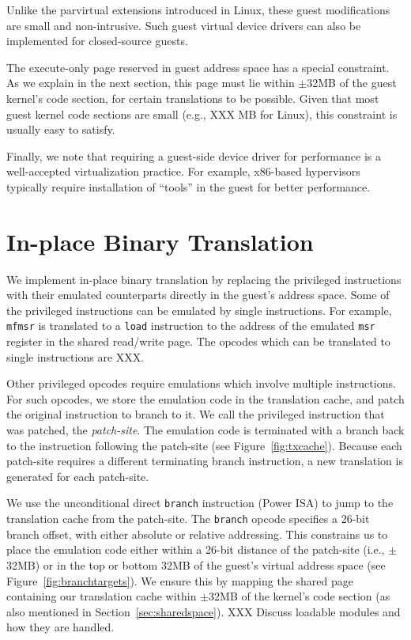 \documentclass[10pt,twocolumn]{article}
\begin{document}
Unlike the parvirtual extensions introduced in Linux, these guest
modifications are small and non-intrusive. Such guest virtual device drivers
can also be implemented for closed-source guests.

The execute-only page reserved in guest address space has a special
constraint. As we explain in the
next section, this page must lie within $\pm$32MB of the
guest kernel's code section, for certain translations to be possible.
Given that most guest kernel code sections are
small (e.g., XXX MB for Linux), this constraint is usually easy to satisfy.

Finally, we note that requiring a guest-side device driver for performance
is a well-accepted virtualization practice. For example, x86-based hypervisors
typically require installation of ``tools'' in the guest for better performance.

\section{In-place Binary Translation}
\label{sec:bintrans}
We implement in-place binary translation by replacing the
privileged instructions
with their emulated counterparts directly
in the guest's address space. Some of the privileged instructions can
be emulated by single instructions. For example, {\tt mfmsr} is translated
to a {\tt load} instruction to the address of the emulated {\tt msr}
register in the shared read/write page. The opcodes which can be
translated to single instructions are XXX.

Other privileged opcodes require emulations which involve multiple instructions.
For such opcodes, we store the emulation code in the translation cache, and
patch the original instruction to branch to it. We call the privileged instruction
that was patched, the {\em patch-site}. The emulation code is terminated
with a branch back to the instruction following the patch-site
(see Figure~\ref{fig:txcache}). Because each patch-site requires a different
terminating branch instruction, a new translation is generated for
each patch-site.

We use the unconditional direct {\tt branch} instruction (Power ISA) to jump to the
translation cache from the patch-site. The {\tt branch} opcode specifies a 26-bit
branch offset, with either absolute or relative addressing. This constrains us
to place the emulation code either within a 26-bit distance of the patch-site (i.e.,
$\pm$32MB) or in the top or bottom 32MB of the guest's virtual address
space (see Figure~\ref{fig:branchtargets}). We ensure this by mapping the shared
page containing our translation cache within $\pm$32MB of the kernel's code
section (as also mentioned in Section~\ref{sec:sharedspace}). XXX Discuss loadable
modules and how they are handled.
\end{document}
